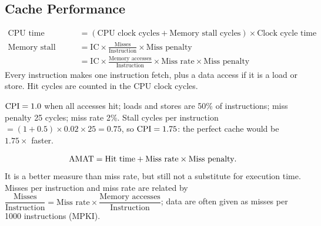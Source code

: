\subsection{Cache Performance}
\label{sec:cache-perf}

\begin{theorem}
\begin{align*}
  \text{CPU time} &= (\text{CPU clock cycles}+\text{Memory stall cycles})\times\text{Clock cycle time}\\
  \text{Memory stall cycles} &= \text{IC}\times\frac{\text{Misses}}{\text{Instruction}}\times\text{Miss penalty}\\
  &= \text{IC}\times\frac{\text{Memory accesses}}{\text{Instruction}}\times\text{Miss rate}\times\text{Miss penalty}
\end{align*}
Every instruction makes one instruction fetch, plus a data access if it is a
load or store. Hit cycles are counted in the CPU clock cycles.
\end{theorem}

\begin{eg}
$\mathrm{CPI}=1.0$ when all accesses hit; loads and stores are 50\% of instructions; miss
penalty 25 cycles; miss rate 2\%. Stall cycles per instruction
$=(1+0.5)\times0.02\times25=0.75$, so $\mathrm{CPI}=1.75$: the perfect cache would be
$1.75\times$ faster.
\end{eg}

\begin{definition}
\[
  \mathrm{AMAT}=\text{Hit time}+\text{Miss rate}\times\text{Miss penalty}.
\]
It is a better measure than miss rate, but still not a substitute for execution
time. Misses per instruction and miss rate are related by
$\dfrac{\text{Misses}}{\text{Instruction}}=\text{Miss rate}\times\dfrac{\text{Memory accesses}}{\text{Instruction}}$;
data are often given as misses per 1000 instructions (MPKI).
\end{definition}


